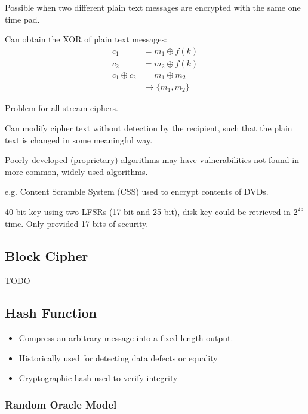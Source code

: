 \documentclass[a4paper]{article}
\begin{document}

Possible when two different plain text messages are encrypted with the same one
time pad.

Can obtain the XOR of plain text messages:
\begin{align*}
               c_{1} &= m_{1} \oplus f(k) \\
               c_{2} &= m_{2} \oplus f(k) \\
  c_{1} \oplus c_{2} &= m_{1} \oplus m_{2} \\
                     &\rightarrow \{m_{1}, m_{2}\}
\end{align*}


Problem for all stream ciphers.

Can modify cipher text without detection by the recipient, such that the plain
text is changed in some meaningful way.


Poorly developed (proprietary) algorithms may have vulnerabilities not found in
more common, widely used algorithms.

e.g. Content Scramble System (CSS) used to encrypt contents of DVDs.

40 bit key using two LFSRs (17 bit and 25 bit), disk key could be retrieved in
$2^{25}$ time. Only provided 17 bits of security.

\subsection{Block Cipher}

TODO

\subsection{Hash Function}

\begin{itemize}
  \item Compress an arbitrary message into a fixed length output.
  \item Historically used for detecting data defects or equality
  \item Cryptographic hash used to verify integrity
\end{itemize}

\subsubsection{Random Oracle Model}
\end{document}
